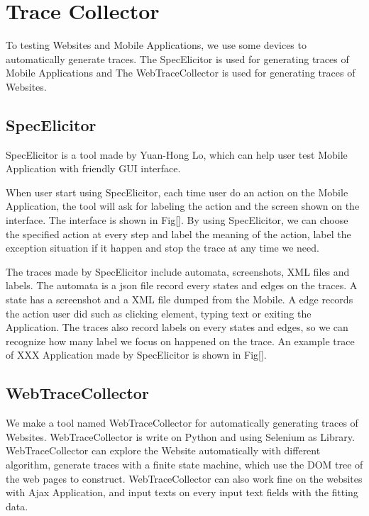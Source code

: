 
\chapter{Trace Collector}\label{ch:traceCollector}

To testing Websites and Mobile Applications, 
we use some devices to automatically generate traces.
The SpecElicitor is used for generating traces of Mobile Applications
and The WebTraceCollector is used for generating traces of Websites.

\section{SpecElicitor}

SpecElicitor is a tool made by Yuan-Hong Lo, 
which can help user test Mobile Application with friendly GUI interface.

When user start using SpecElicitor,
each time user do an action on the Mobile Application, 
the tool will ask for labeling the action and the screen shown on the interface.
The interface is shown in Fig[].
By using SpecElicitor, we can choose the specified action at every step and label the meaning of the action,
label the exception situation if it happen and stop the trace at any time we need.

The traces made by SpecElicitor include automata, screenshots, XML files and labels.
The automata is a json file record every states and edges on the traces.
A state has a screenshot and a XML file dumped from the Mobile.
A edge records the action user did such as clicking element, typing text or exiting the Application.
The traces also record labels on every states and edges,
so we can recognize how many label we focus on happened on the trace.
An example trace of XXX Application made by SpecElicitor is shown in Fig[].


\section{WebTraceCollector}

We make a tool named WebTraceCollector for automatically generating traces of Websites.
WebTraceCollector is write on Python and using Selenium as Library.
WebTraceCollector can explore the Website automatically with different algorithm,
generate traces with a finite state machine, which use the DOM tree of the web pages to construct.
WebTraceCollector can also work fine on the websites with Ajax Application,
and input texts on every input text fields with the fitting data.

